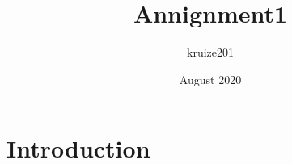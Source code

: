 \documentclass{article}
\title{Annignment1}
\author{kruize201 }
\date{August 2020}
\begin{document}
\maketitle

\section{Introduction}
\end{document}

